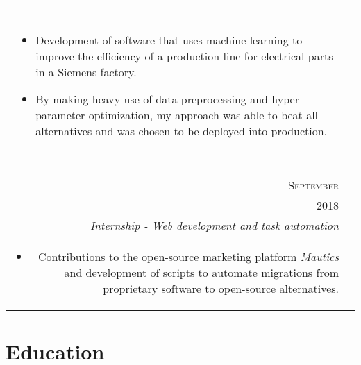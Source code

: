 \documentclass[a4paper,10pt]{article}
\begin{document}
\begin{tabularx}{\textwidth}{ r | X }
\begin{tabular}{p{}}
\begin{itemize}[leftmargin=*]
        \item Development of software that uses machine learning to improve the
            efficiency of a production line for electrical parts in a Siemens
            factory.

        \item By making heavy use of data preprocessing and hyper-parameter
            optimization, my approach was able to beat all alternatives and was
            chosen to be deployed into production.

    \end{itemize}
    \end{tabular}
    \vspace{-6mm} \\
  \multicolumn{2}{c}{}\\

  \begin{tabular}{r}
      \textsc{August \&} \\
      \textsc{September} \\
      \textsc{2018}
  \end{tabular} &

  \begin{tabular}{p{}}
    \textsc{Padberg \& Partners} \\
    \emph{Internship - Web development and task automation}\\
    \vspace{-2mm}
    \begin{itemize}[leftmargin=*]

        \item Contributions to the open-source marketing platform
            \textit{Mautics} and development of scripts to automate migrations
            from proprietary software to open-source alternatives.

    \end{itemize}
  \end{tabular}
  \vspace{-6mm} \\

\end{tabularx}

\section{Education}
\end{document}
